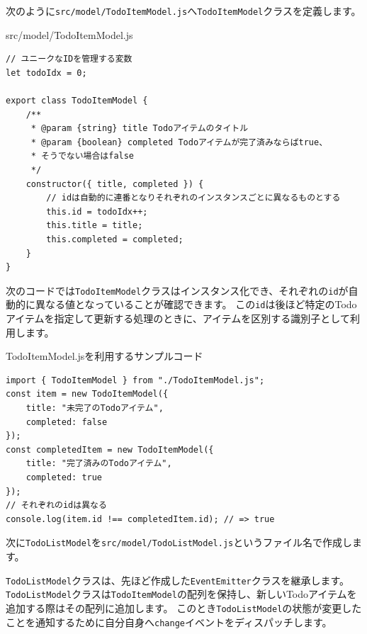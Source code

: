 次のように\texttt{src/model/TodoItemModel.js}へ\texttt{TodoItemModel}クラスを定義します。

\begin{listtitle}
src/model/TodoItemModel.js
\end{listtitle}
\begin{lstlisting}
// ユニークなIDを管理する変数
let todoIdx = 0;

export class TodoItemModel {
    /**
     * @param {string} title Todoアイテムのタイトル
     * @param {boolean} completed Todoアイテムが完了済みならばtrue、
     * そうでない場合はfalse
     */
    constructor({ title, completed }) {
        // idは自動的に連番となりそれぞれのインスタンスごとに異なるものとする
        this.id = todoIdx++;
        this.title = title;
        this.completed = completed;
    }
}
\end{lstlisting}
\listend

次のコードでは\texttt{TodoItemModel}クラスはインスタンス化でき、それぞれの\texttt{id}が自動的に異なる値となっていることが確認できます。
この\texttt{id}は後ほど特定のTodoアイテムを指定して更新する処理のときに、アイテムを区別する識別子として利用します。

\begin{listtitle}
TodoItemModel.jsを利用するサンプルコード
\end{listtitle}
\begin{lstlisting}
import { TodoItemModel } from "./TodoItemModel.js";
const item = new TodoItemModel({
    title: "未完了のTodoアイテム",
    completed: false
});
const completedItem = new TodoItemModel({
    title: "完了済みのTodoアイテム",
    completed: true
});
// それぞれのidは異なる
console.log(item.id !== completedItem.id); // => true
\end{lstlisting}
\listend

次に\texttt{TodoListModel}を\texttt{src/model/TodoListModel.js}というファイル名で作成します。

\texttt{TodoListModel}クラスは、先ほど作成した\texttt{EventEmitter}クラスを継承します。
\texttt{TodoListModel}クラスは\texttt{TodoItemModel}の配列を保持し、新しいTodoアイテムを追加する際はその配列に追加します。
このとき\texttt{TodoListModel}の状態が変更したことを通知するために自分自身へ\texttt{change}イベントをディスパッチします。

